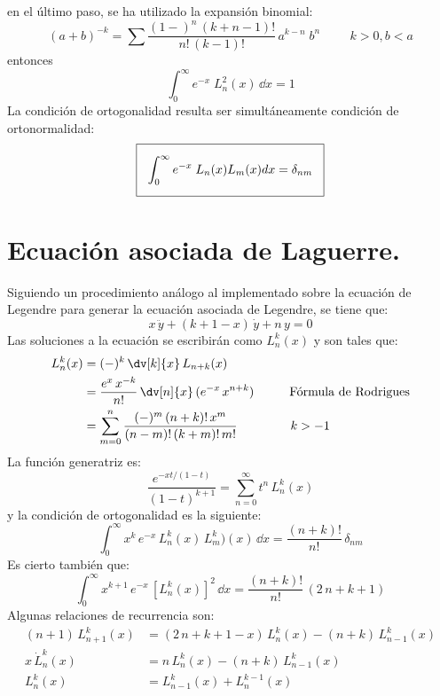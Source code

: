 en el último paso, se ha utilizado la expansión binomial:
\[  (a + b)^{-k} = \sum \dfrac{(1-)^{n} \, (k + n - 1)!}{n! \, (k -1)!} \, a^{k - n} \; b^{n} \hspace{1cm} k >0, b < a \]
entonces
\[ \int_{0}^{\infty} e^{-x} \; L_{n}^{2}(x) \, \dd x = 1 \]
La condición de ortogonalidad resulta ser simultáneamente condición de ortonormalidad:
\begin{equation}
\setlength{\fboxsep}{3\fboxsep}\boxed{\int_{0}^{\infty} e^{-x} \; L_{n}(x) L_{m}(x) d x = \delta_{nm} }
\label{eq:ecuacion_08_78}
\end{equation}
\section{Ecuación asociada de Laguerre.}
Siguiendo un procedimiento análogo al implementado sobre la ecuación de Legendre para generar la ecuación asociada de Legendre, se tiene que:
\[ x \, \ddot{y} + (k + 1 - x) \, \dot{y} +  n \, y = 0 \]
Las soluciones a la ecuación se escribirán como $L_{n}^{k} (x)$ y son tales que:
\begin{align*}
L_{n}^{k} (x) &= (-)^{k} \, \dv[k]{x} \, L_{n+k} (x) \\
&= \dfrac{e^{x} \, x^{-k}}{n!} \, \dv[n]{x} \, (e^{-x} \, x^{n+k}) \hspace{1cm} \mbox{Fórmula de Rodrigues} \\
&= \sum_{m=0}^{n} \dfrac{(-)^{m} \, (n + k)! \, x^{m}}{(n -m )! \, (k + m)! \, m!} \hspace{1.5cm} k > -1
\end{align*}
La función generatriz es:
\[ \dfrac{e^{-xt/(1-t)}}{(1 - t)^{k+1}} = \sum_{n=0}^{\infty} t^{n} \, L_{n}^{k} (x) \]
y la condición de ortogonalidad es la siguiente:
\begin{equation}
\int_{0}^{\infty} x^{k} \, e^{-x} \, L_{n}^{k} (x) \, L_{m}^{k} )(x) \, \dd x = \dfrac{(n + k)!}{n!} \, \delta_{nm}
\label{eq:ecuacion_08_79}
 \end{equation}
Es cierto también que:
\[ \int_{0}^{\infty} x^{k+1} \, e^{-x} \, [L_{n}^{k} (x)]^{2} \, \dd x = \dfrac{(n+k)!}{n!} \, (2 \, n +k + 1) \]
Algunas relaciones de recurrencia son:
\begin{align*}
(n + 1) \, L_{n+1}^{k} (x) &= (2 \, n + k + 1 - x) \, L_{n}^{k} (x) - (n + k) \, L_{n-1}^{k} (x) \\[0.5em]
x \, \dot{L}_{n}^{k} (x) &= n \, L_{n}^{k} (x) - (n + k) \, L_{n-1}^{k} (x) \\[0.5em]
L_{n}^{k} (x) &= L_{n-1}^{k}(x) + L_{n}^{k-1}(x)
\end{align*}

